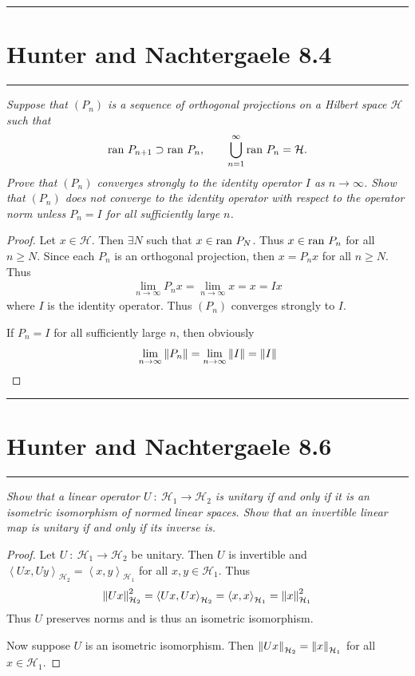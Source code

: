 \documentclass{article} %
\theoremstyle{plain}
\newcommand{\VEC}[2]{\left\langle #1, #2 \right\rangle}
\newcommand{\ran}{\text{\rm ran }}
\newcommand{\problem}[1]{
\vspace{.375cm}
\begin{minipage}{\textwidth}
    \begin{center}
        \noindent\rule{5cm}{1pt}
    \end{center}
    \section{\bf #1}
    \begin{center}
        \noindent\rule{5cm}{1pt}
    \end{center}
    \vspace{0.25cm}
\end{minipage}
}
\numberwithin{equation}{section} %
\numberwithin{figure}{section} %
\numberwithin{table}{section} %
\begin{document}
\problem{Hunter and Nachtergaele 8.4}
\emph{Suppose that $(P_n)$ is a sequence of orthogonal projections on a Hilbert space $\mathcal{H}$ such that $$\ran P_{n+1} \supset \ran P_n, \qquad \bigcup_{n=1}^\infty \ran P_n = \mathcal{H}.$$  Prove that $(P_n)$ converges strongly to the identity operator $I$ as $n \rightarrow \infty$.  Show that $(P_n)$ does not converge to the identity operator with respect to the operator norm unless $P_n = I$ for all sufficiently large $n$.} \\

\begin{proof}
    Let $x \in \mathcal{H}$.  Then $\exists N$ such that $x \in \ran P_N$.  Thus $x \in \ran P_n$ for all $n \geq N$.  Since each $P_n$ is an orthogonal projection, then $x = P_n x$ for all $n \geq N$.  Thus
    \begin{align*}
        \lim_{n\rightarrow \infty}P_n x = \lim_{n \rightarrow \infty} x = x = I x
    \end{align*}
    where $I$ is the identity operator.  Thus $(P_n)$ converges strongly to $I$.

    If $P_n = I$ for all sufficiently large $n$, then obviously
    \begin{align*}
        \lim_{n\rightarrow \infty} \norm{P_n} = \lim_{n\rightarrow \infty}\norm{I} = \norm{I}
    \end{align*}
\end{proof}









\problem{Hunter and Nachtergaele 8.6}
\emph{Show that a linear operator $U\ :\ \mathcal{H}_1 \rightarrow \mathcal{H}_2$ is unitary if and only if it is an isometric isomorphism of normed linear spaces.  Show that an invertible linear map is unitary if and only if its inverse is.} \\

\begin{proof}
    Let $U\ :\ \mathcal{H}_1 \rightarrow \mathcal{H}_2$ be unitary.  Then $U$ is invertible and $\VEC{Ux}{Uy}_{\mathcal{H}_2} = \VEC{x}{y}_{\mathcal{H}_1}$ for all $x, y \in \mathcal{H}_1$.  Thus
    \begin{align*}
        \norm{Ux}_{\mathcal{H}_2}^2 = \VEC{Ux}{Ux}_{\mathcal{H}_2} = \VEC{x}{x}_{\mathcal{H}_1} = \norm{x}_{\mathcal{H}_1}^2
    \end{align*}
    Thus $U$ preserves norms and is thus an isometric isomorphism.

    Now suppose $U$ is an isometric isomorphism.  Then $\norm{Ux}_{\mathcal{H}_2} = \norm{x}_{\mathcal{H}_1}$ for all $x \in \mathcal{H}_1$.
\end{proof}
\end{document}
